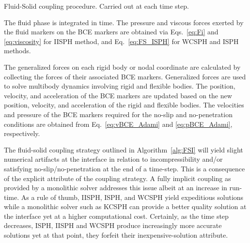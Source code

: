 \begin{algorithm}[H] 
	\caption{Fluid-Solid coupling procedure. Carried out at each time step.}
	\begin{algorithmic}[1]
		\STATE The fluid phase is integrated in time.
		\STATE  The pressure and viscous forces exerted by the fluid markers on the BCE markers are obtained via
		Eqs.~\ref{eq:Fi} and \ref{eq:viscosity} for IISPH method,
		and Eq.~\ref{eq:FS_ISPH} for WCSPH and ISPH methods.
		
		
		
		\STATE The generalized forces on each rigid body or nodal coordinate are calculated by collecting the forces of their associated BCE markers.
		\STATE Generalized forces are used to solve multibody dynamics involving rigid and flexible bodies.
		\STATE The position, velocity, and acceleration of the BCE markers are updated based on the new position, velocity, and acceleration of the rigid and flexible bodies.
		\STATE The velocities and pressure of the BCE markers required for the no-slip and no-penetration conditions are obtained from Eq.~\ref{eq:vBCE_Adami} and \ref{eq:pBCE_Adami}, respectively.
	\end{algorithmic}\label{alg:FSI}
\end{algorithm}

The fluid-solid coupling strategy outlined in Algorithm~\ref{alg:FSI} will yield slight numerical artifacts at the interface in relation to incompressibility and/or satisfying no-slip/no-penetration at the end of a time-step. This is a consequence of the explicit attribute of the coupling strategy. A fully implicit coupling as provided by a monolithic solver addresses this issue albeit at an increase in run-time.  As a rule of thumb, IISPH, ISPH, and WCSPH yield expeditious solutions while a monolithic solver such as KCSPH can provide a better quality solution at the interface yet at a higher computational cost. Certainly, as the time step decreases, ISPH, IISPH and WCSPH produce increasingly more accurate solutions yet at that point, they forfeit their inexpensive-solution attribute.

